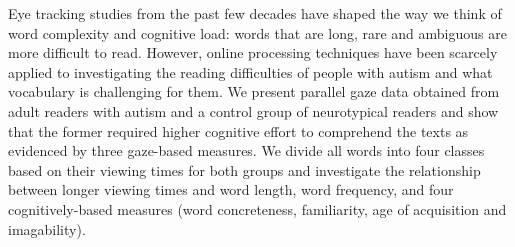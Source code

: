 Eye tracking studies from the past few decades have shaped the way we think of word complexity and cognitive load: words that are long, rare and ambiguous are more difficult to read. However, online processing techniques have been scarcely applied to investigating the reading difficulties of people with autism and what vocabulary is challenging for them. We present parallel gaze data obtained from adult readers with autism and a control group of neurotypical readers and show that the former required higher cognitive effort to comprehend the texts as evidenced by three gaze-based measures. We divide all words into four classes based on their viewing times for both groups and investigate the relationship between longer viewing times and word length, word frequency, and four cognitively-based measures (word concreteness, familiarity, age of acquisition and imagability).
